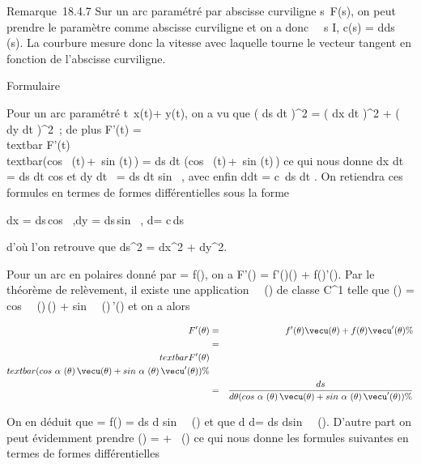 Remarque~18.4.7 Sur un arc paramétré par abscisse curviligne
s\mapsto~F(s), on peut prendre le paramètre comme
abscisse curviligne et on a donc \forall~~s \in I,
c\Gamma(s) = d\phi \over ds (s). La courbure mesure
donc la vitesse avec laquelle tourne le vecteur tangent en fonction de
l'abscisse curviligne.

Formulaire

Pour un arc paramétré
t\mapsto~x(t)\vec\imath +
y(t), on a vu que \left ( ds
\over dt \right )^2 =
\left ( dx \over dt
\right )^2 + \left ( dy
\over dt \right )^2~; de plus
F'(t) =\\textbar{}
F'(t)\\textbar{}(cos~
\phi(t)\,\vec\imath +\
sin \phi(t)\,) = ds
\over dt (cos~
\phi(t)\,\vec\imath +\
sin \phi(t)\,) ce qui nous donne
 dx \over dt = ds \over dt
 cos \phi et  dy \over dt~ =
ds \over dt  sin~ \phi, avec
enfin  d\phi \over dt = c\Gamma\,
ds \over dt . On retiendra ces formules en termes de
formes différentielles sous la forme

dx = ds\,cos~
\phi,\quad dy =
ds\,sin~ \phi,\quad
d\phi = c\,ds

d'où l'on retrouve que ds^2 = dx^2 +
dy^2.

Pour un arc en polaires donné par \rho = f(\theta), on a F'(\theta) =
f'(\theta)\vecu(\theta) + f(\theta)\vecu'(\theta). Par
le théorème de relèvement, il existe une application
\theta\mapsto~\alpha~(\theta) de classe C^1 telle que
\vect(\theta) = cos~
\alpha~(\theta)\,\vecu(\theta)
+ sin~
\alpha~(\theta)\,\vecu'(\theta) et on a alors

\begin{align*} F'(\theta)& =&
f'(\theta)\vecu(\theta) + f(\theta)\vecu'(\theta) \%&
\\ & =&
\\textbar{}F'(\theta)\\textbar{}(cos~
\alpha~(\theta)\,\vecu(\theta)
+ sin~
\alpha~(\theta)\,\vecu'(\theta))\%&
\\ & =& ds \over d\theta
(cos~
\alpha~(\theta)\,\vecu(\theta)
+ sin~
\alpha~(\theta)\,\vecu'(\theta)) \%&
\\ \end{align*}

On en déduit que \rho = f(\theta) = ds \over d\theta
 sin~ \alpha~(\theta) et que  d\rho \over
d\theta = ds \over d\theta  sin~
\alpha~(\theta). D'autre part on peut évidemment prendre \phi(\theta) = \theta + \alpha~(\theta) ce qui
nous donne les formules suivantes en termes de formes différentielles

